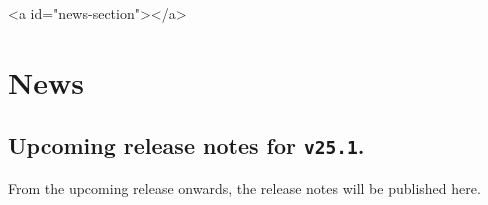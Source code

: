 \ifdefined\HCode
\begin{html}
<a id="news-section"></a>
\end{html}
\fi
\chapter*{News}

\section*{Upcoming release notes for \texttt{v25.1}.}

  From the upcoming release onwards, the release notes will be published here.
